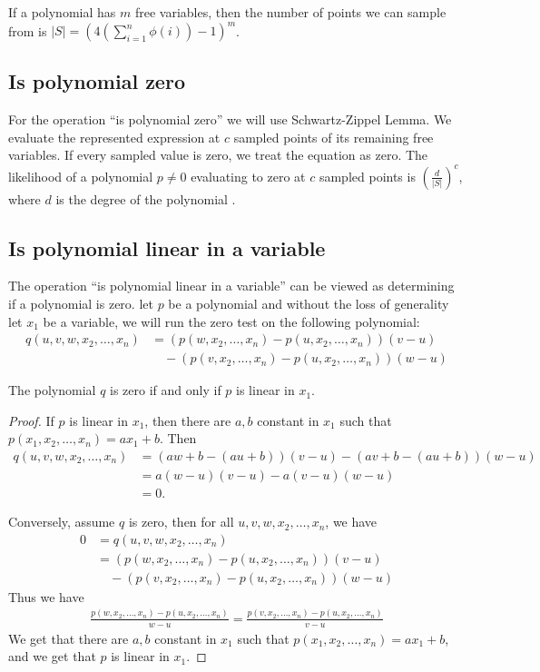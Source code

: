 If a polynomial has $m$ free variables, then the number of points we can sample from is $|S| = (4(\sum_{i=1}^{n} \phi(i)) - 1)^m$.

\subsection*{Is polynomial zero}
For the operation ``is polynomial zero'' we will use Schwartz-Zippel Lemma. We evaluate the represented expression at $c$ sampled points of its remaining free variables. If every sampled value is zero, we treat the equation as zero.
The likelihood of a polynomial $p \neq 0$ evaluating to zero at $c$ sampled points is $(\frac{d}{|S|})^c$, where $d$ is the degree of the polynomial \cite{schwartz1980fast, zippel1979probabilistic}.

\subsection*{Is polynomial linear in a variable}
The operation ``is polynomial linear in a variable'' can be viewed as determining if a polynomial is zero. let $p$ be a polynomial and without the loss of generality let $x_1$ be a variable, we will run the zero test on the following polynomial:
\begin{align*}
  q(u, v, w, x_2, \dots, x_n) &= (p(w, x_2, \dots, x_n) - p(u, x_2, \dots, x_n)) (v - u) \\
  &\quad - (p(v, x_2, \dots, x_n) - p(u, x_2, \dots, x_n)) (w - u)
\end{align*}

\begin{lemma}
  The polynomial $q$ is zero if and only if $p$ is linear in $x_1$.
\end{lemma}
\begin{proof}
  If $p$ is linear in $x_1$, then there are $a, b$ constant in $x_1$ such that $p(x_1, x_2, \dots, x_n) = a x_1 + b$. Then
  \begin{align*}
    q(u, v, w, x_2, \dots, x_n) &= (a w + b - (a u + b)) (v - u) - (a v + b - (a u + b)) (w - u) \\
    &= a (w - u) (v - u) - a (v - u) (w - u) \\
    &= 0.
  \end{align*}

  Conversely, assume $q$ is zero, then for all $u, v, w, x_2, \dots, x_n$, we have
  \begin{align*}
    0 &= q(u, v, w, x_2, \dots, x_n) \\
    &= (p(w, x_2, \dots, x_n) - p(u, x_2, \dots, x_n)) (v - u) \\
    &\quad - (p(v, x_2, \dots, x_n) - p(u, x_2, \dots, x_n)) (w - u)
  \end{align*}
  Thus we have
  \begin{align*}
    \frac{p(w, x_2, \dots, x_n) - p(u, x_2, \dots, x_n)}{w - u} = \frac{p(v, x_2, \dots, x_n) - p(u, x_2, \dots, x_n)}{v - u}
  \end{align*}
  We get that there are $a, b$ constant in $x_1$ such that $p(x_1, x_2, \dots, x_n) = a x_1 + b$, and we get that $p$ is linear in $x_1$.
\end{proof}


